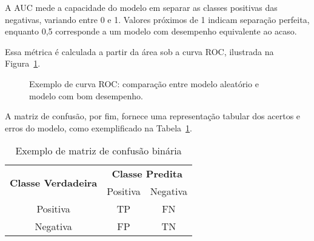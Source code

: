 \documentclass[
    12pt,                %
    openright,           %
    oneside,             %
    a4paper,             %
    brazil               %
]{abntex2}
\begin{document}
A AUC mede a capacidade do modelo em separar as classes positivas das negativas, variando entre 0 e 1. Valores próximos de 1 indicam separação perfeita, enquanto 0,5 corresponde a um modelo com desempenho equivalente ao acaso. 

Essa métrica é calculada a partir da área sob a curva ROC, ilustrada na Figura~\ref{fig:roc}.


\begin{figure}[H]
    \centering
    \caption{Exemplo de curva ROC: comparação entre modelo aleatório e modelo com bom desempenho.}
    \label{fig:roc}
\end{figure}

A matriz de confusão, por fim, fornece uma representação tabular dos acertos e erros do modelo, como exemplificado na Tabela~\ref{tab:matriz_confusao}.

\begin{table}[H]
\centering
\caption{Exemplo de matriz de confusão binária}
\label{tab:matriz_confusao}
\begin{tabular}{|c|c|c|}
\hline
\multirow{2}{*}{\textbf{Classe Verdadeira}} & \multicolumn{2}{c|}{\textbf{Classe Predita}} \\ \cline{2-3} 
 & Positiva & Negativa \\ \hline
Positiva & TP & FN \\ \hline
Negativa & FP & TN \\ \hline
\end{tabular}
\end{table}
\end{document}
